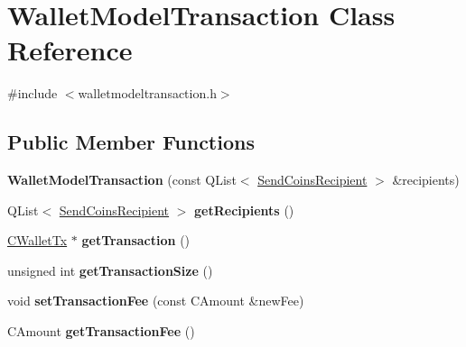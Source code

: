 \hypertarget{class_wallet_model_transaction}{}\section{Wallet\+Model\+Transaction Class Reference}
\label{class_wallet_model_transaction}


{\ttfamily \#include $<$walletmodeltransaction.\+h$>$}

\subsection*{Public Member Functions}
\begin{DoxyCompactItemize}
\item 
\mbox{\label{class_wallet_model_transaction_aab5bd2eb6244b6f0e12d8511d64caf82}} 
{\bfseries Wallet\+Model\+Transaction} (const Q\+List$<$ \mbox{\hyperlink{class_send_coins_recipient}{Send\+Coins\+Recipient}} $>$ \&recipients)
\item 
\mbox{\label{class_wallet_model_transaction_a477180740c53bbbaed217faec2ccb8fa}} 
Q\+List$<$ \mbox{\hyperlink{class_send_coins_recipient}{Send\+Coins\+Recipient}} $>$ {\bfseries get\+Recipients} ()
\item 
\mbox{\label{class_wallet_model_transaction_a1db8f14976edf56a7678d9f7b390c0c5}} 
\mbox{\hyperlink{class_c_wallet_tx}{C\+Wallet\+Tx}} $\ast$ {\bfseries get\+Transaction} ()
\item 
\mbox{\label{class_wallet_model_transaction_a90c87be7e23c1729edba4ab621771a5e}} 
unsigned int {\bfseries get\+Transaction\+Size} ()
\item 
\mbox{\label{class_wallet_model_transaction_a1a5d5ee7f676a90b9e0bfc9f2b452c44}} 
void {\bfseries set\+Transaction\+Fee} (const C\+Amount \&new\+Fee)
\item 
\mbox{\label{class_wallet_model_transaction_ac9ca968ca58fb4609db74111525981d6}} 
C\+Amount {\bfseries get\+Transaction\+Fee} ()
\item 
\mbox{\label{class_wallet_model_transaction_a215d9f347eaf67189ef5eb2c4492384c}} 

\end{DoxyCompactItemize}
